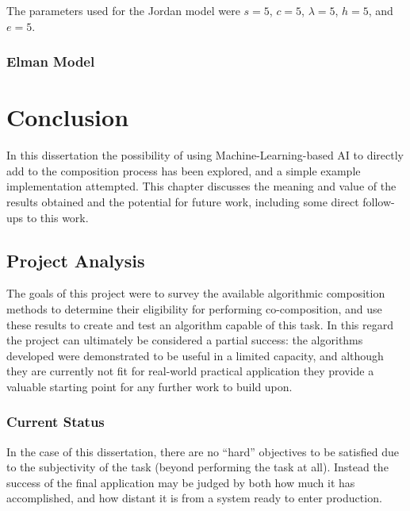 \documentclass[ author={Stephen Livermore-Tozer},
				supervisor={Dr. Peter Flach},
				degree={MEng},
				title={Algorithmic Co-composition Using Machine Learning},
				subtitle={},
				type={research},
				year={2016} ]{dissertation}
\begin{document}
	The parameters used for the Jordan model were $s = 5$, $c = 5$, $\lambda = 5$, $h = 5$, and $e = 5$. 
	
	
	
	\subsection{Elman Model}
	
	
	\chapter{Conclusion}
	\label{chap:conclusion}
	
	In this dissertation the possibility of using Machine-Learning-based AI to directly add to the composition process has been explored, and a simple example implementation attempted. This chapter discusses the meaning and value of the results obtained and the potential for future work, including some direct follow-ups to this work.
	
	\section{Project Analysis}
	\label{sec:project-analysis}
	
	The goals of this project were to survey the available algorithmic composition methods to determine their eligibility for performing co-composition, and use these results to create and test an algorithm capable of this task. In this regard the project can ultimately be considered a partial success: the algorithms developed were demonstrated to be useful in a limited capacity, and although they are currently not fit for real-world practical application they provide a valuable starting point for any further work to build upon.
	
	\subsection{Current Status}
	\label{sec:project-status}
	
	In the case of this dissertation, there are no ``hard'' objectives to be satisfied due to the subjectivity of the task (beyond performing the task at all). Instead the success of the final application may be judged by both how much it has accomplished, and how distant it is from a system ready to enter production.
	
\end{document}
